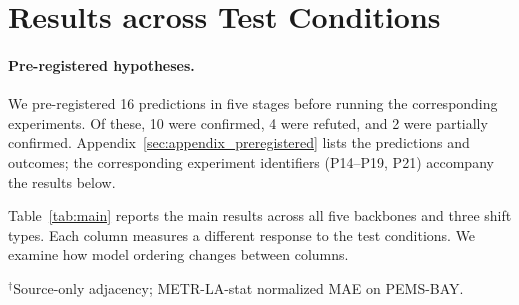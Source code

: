\section{Results across Test Conditions}
\label{sec:taxonomy}

\paragraph{Pre-registered hypotheses.}
We pre-registered 16 predictions in five stages before running the corresponding experiments.
Of these, 10 were confirmed, 4 were refuted, and 2 were partially confirmed.
Appendix~\ref{sec:appendix_preregistered} lists the predictions and outcomes; the corresponding experiment identifiers (P14--P19, P21) accompany the results below.

Table~\ref{tab:main} reports the main results across all five backbones and three shift types.
Each column measures a different response to the test conditions. We examine how model ordering changes between columns.

\begin{table}[H]
\centering
\caption{\textbf{Robustness rankings are shift-specific.}
Five backbones evaluated across sensor dropout, cross-city transfer, and
temporal subgroup shift. Values are mean $\pm$ population std over 3 seeds;
lower is better.}
\label{tab:main}
\vskip 0.05in
{\footnotesize $^{\dagger}$Source-only adjacency; METR-LA-stat normalized MAE on PEMS-BAY.}
\end{table}

